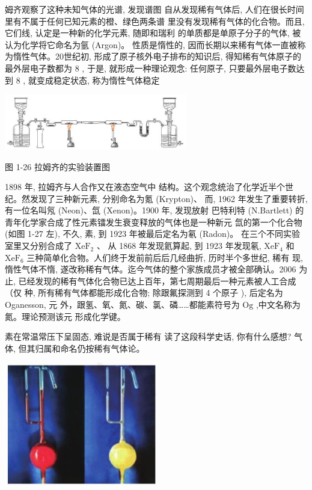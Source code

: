 \documentclass[10pt]{article}
\begin{document}
姆齐观察了这种未知气体的光谱, 发现谱图 自从发现稀有气体后, 人们在很长时间里有不属于任何已知元素的橙、绿色两条谱 里没有发现稀有气体的化合物。而且, 它们线, 认定是一种新的化学元素, 随即和瑞利 的单质都是单原子分子的气体, 被认为化学将它命名为氩 (Argon)。 性质是惰性的, 因而长期以来稀有气体一直被称为惰性气体。20世纪初, 形成了原子核外电子排布的知识后, 得知稀有气体原子的最外层电子数都为 8 , 于是, 就形成一种理论观念: 任何原子, 只要最外层电子数达到 8 , 就变成稳定状态, 称为惰性气体稳定

\begin{center}
\includegraphics[max width=0.6\textwidth]{images/0190e026-5a11-7df7-bd27-54d09026ba7a_30_268867.jpg}
\end{center}

图 1-26 拉姆齐的实验装置图

1898 年, 拉姆齐与人合作又在液态空气中 结构。这个观念统治了化学近半个世纪。然发现了三种新元素, 分别命名为氪 (Krypton)、 而, 1962 年发生了重要转折, 有一位名叫氖 (Neon)、氙 (Xenon)。1900 年, 发现放射 巴特利特 (N.Bartlett) 的青年化学家合成了性元素镭发生衰变释放的气体也是一种新元 氙的第一个化合物 (如图 1-27 左), 不久, 素, 到 1923 年被最后定名为氡 (Radon)。 在三个不同实验室里又分别合成了 \({\mathrm{{XeF}}}_{2}\) 、 从 1868 年发现氦算起, 到 1923 年发现氡, \({\mathrm{{XeF}}}_{4}\) 和 \({\mathrm{{XeF}}}_{6}\) 三种简单化合物。人们终于发前前后后几经曲折, 历时半个多世纪, 稀有 现, 惰性气体不惰, 遂改称稀有气体。迄今气体的整个家族成员才被全部确认。2006 为止, 已经发现的稀有气体化合物已达上百年，第七周期最后一种元素被人工合成（仅 种, 所有稀有气体都能形成化合物; 除跟氟探测到 4 个原子 ), 后定名为 Oganesson, 元 外，跟氢、氧、氮、碳、氯、磷……都能素符号为 \(\mathrm{{Og}}\) ,中文名称为氮。理论预测该元 形成化学键。

素在常温常压下呈固态, 难说是否属于稀有 读了这段科学史话, 你有什么感想? 气体, 但其归属和命名仍按稀有气体论。

\begin{center}
\includegraphics[max width=0.5\textwidth]{images/0190e026-5a11-7df7-bd27-54d09026ba7a_30_313270.jpg}
\end{center}
\end{document}

